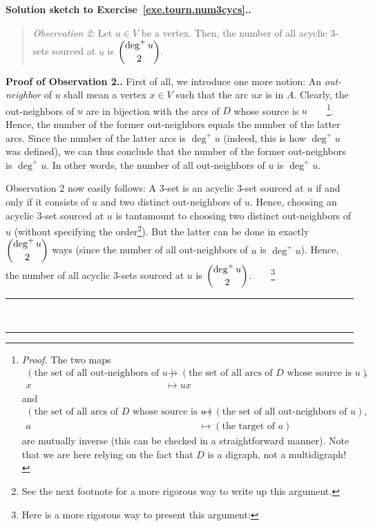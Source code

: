 \documentclass[numbers=enddot,12pt,final,onecolumn,notitlepage]{scrartcl}%
\theoremstyle{definition}
\newenvironment{statement}{\begin{quote}}{\end{quote}}
\newenvironment{proof}[1][Proof]{\noindent\textbf{#1.} }{\ \rule{0.5em}{0.5em}}
\newcommand{\tup}[1]{\left( #1 \right)}
\begin{document}
\begin{proof}[Solution sketch to Exercise~\ref{exe.tourn.num3cycs}.]
\begin{statement}
\textit{Observation 2:} Let $u \in V$ be a vertex. Then, the number
of all acyclic 3-sets sourced at $u$ is $\dbinom{\deg^+ u}{2}$.
\end{statement}
\begin{proof}[Proof of Observation 2.]
First of all, we introduce one more notion:
An \textit{out-neighbor} of $u$ shall mean a vertex $x \in V$
such that the arc $ux$ is in $A$.
Clearly, the out-neighbors of $u$ are in bijection with the arcs of
$D$ whose source is $u$\ \ \ \ \footnote{\textit{Proof.} The two maps
\begin{align*}
\tup{\text{the set of all out-neighbors of } u}
&\to
\tup{\text{the set of all arcs of } D \text{ whose source is } u}, \\
x &\mapsto ux
\end{align*}
and
\begin{align*}
\tup{\text{the set of all arcs of } D \text{ whose source is } u}
&\to
\tup{\text{the set of all out-neighbors of } u}, \\
a &\mapsto \tup{\text{the target of } a}
\end{align*}
are mutually inverse (this can be checked in a straightforward
manner). Note that we are here relying on the fact that $D$ is a
digraph, not a multidigraph!}. Hence, the number of the former
out-neighbors equals the number of the latter arcs.
Since the number of the latter arcs
is $\deg^+ u$ (indeed, this is how $\deg^+ u$ was defined), we can
thus conclude that the number of the former out-neighbors is
$\deg^+ u$. In other words, the number of all out-neighbors of $u$
is $\deg^+ u$.

Observation 2 now easily follows: A 3-set is an acyclic 3-set sourced
at $u$ if and only if it consists of $u$ and two distinct
out-neighbors of $u$. Hence, choosing an acyclic 3-set sourced at $u$
is tantamount to choosing two distinct out-neighbors of $u$ (without
specifying the order\footnote{See the next footnote for a more
rigorous way to write up this argument.}).
But the latter can be done in exactly $\dbinom{\deg^+ u}{2}$
ways (since the number of all out-neighbors of $u$ is $\deg^+ u$).
Hence, the number of all acyclic 3-sets sourced at $u$ is
$\dbinom{\deg^+ u}{2}$.\ \ \ \ \footnote{Here is a more rigorous way
to present this argument:

}
\end{proof}
\end{proof}
\end{document}
